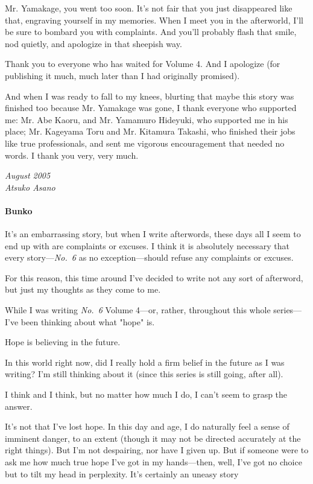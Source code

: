 Mr. Yamakage, you went too soon. It's not fair that you just disappeared
like that, engraving yourself in my memories. When I meet you in the
afterworld, I'll be sure to bombard you with complaints. And you'll
probably flash that smile, nod quietly, and apologize in that sheepish
way.

Thank you to everyone who has waited for Volume 4. And I apologize (for
publishing it much, much later than I had originally promised).

And when I was ready to fall to my knees, blurting that maybe this story
was finished too because Mr. Yamakage was gone, I thank everyone who
supported me: Mr. Abe Kaoru, and Mr. Yamamuro Hideyuki, who supported me
in his place; Mr. Kageyama Toru and Mr. Kitamura Takashi, who finished
their jobs like true professionals, and sent me vigorous encouragement
that needed no words. I thank you very, very much.

\myspace

\emph{August 2005\\
	Atsuko Asano}

\paragraph{Bunko}

It's an embarrassing story, but when I write afterwords, these days all
I seem to end up with are complaints or excuses. I think it is
absolutely necessary that every story---\emph{No.~6} as no exception---should
refuse any complaints or excuses.

For this reason, this time around I've decided to write not any sort of
afterword, but just my thoughts as they come to me.

While I was writing \emph{No.~6} Volume 4---or, rather, throughout this whole
series---I've been thinking about what "hope" is.

Hope is believing in the future.

In this world right now, did I really hold a firm belief in the future
as I was writing? I'm still thinking about it (since this series is
still going, after all).

I think and I think, but no matter how much I do, I can't seem to grasp
the answer.

It's not that I've lost hope. In this day and age, I do naturally feel a
sense of imminent danger, to an extent (though it may not be directed
accurately at the right things). But I'm not despairing, nor have I
given up. But if someone were to ask me how much true hope I've got in
my hands---then, well, I've got no choice but to tilt my head in
perplexity. It's certainly an uneasy story\el 


